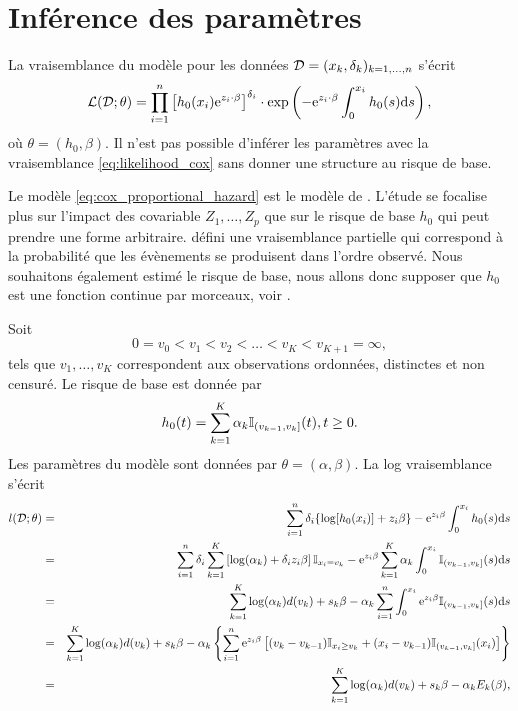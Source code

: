 \section{Inférence des paramètres}
La vraisemblance du modèle pour les données $\mathcal{D} = (x_k,\delta_k)_{k=1,\ldots, n}$ s'écrit 
\begin{equation}\label{eq:likelihood_cox}
\mathcal{L}(\mathcal{D};\theta) =\prod_{i=1}^n \left[h_0(x_i)\mathrm{e}^{z_i\cdot \beta}\right]^{\delta_i}\cdot\exp\left(-\mathrm{e}^{z_i\cdot\beta} \int_0^{x_i}h_0(s)\text{d}s\right) ,
\end{equation}
où $\theta = (h_0,\beta)$. Il n'est pas possible d'inférer les paramètres avec la vraisemblance \eqref{eq:likelihood_cox} sans donner une structure au risque de base. 
\begin{remark}
Le modèle \eqref{eq:cox_proportional_hazard} est le modèle de \citet{Cox1972}. L'étude se focalise plus sur l'impact des covariable $Z_1,\ldots, Z_p$ que sur le risque de base $h_0$ qui peut prendre une forme arbitraire. \citet{Cox1972} défini une vraisemblance partielle qui correspond à la probabilité que les évènements se produisent dans l'ordre observé. Nous souhaitons également estimé le risque de base, nous allons donc supposer que $h_0$ est une fonction continue par morceaux, voir \citet{Breslow1975}.
\end{remark}
Soit 
$$
0=v_0<v_1<v_2<\ldots<v_K<v_{K+1}=\infty,
$$
tels que $v_1,\ldots, v_K$ correspondent aux observations ordonnées, distinctes et non censuré. Le risque de base est donnée par
$$
h_0(t)=\sum_{k=1}^{K}\alpha_k\mathbb{I}_{(v_{k-1}, v_{k}]}(t),t\geq 0.
$$
Les paramètres du modèle sont données par $\theta = (\alpha, \beta)$. La log vraisemblance s'écrit
\begin{eqnarray*}
l(\mathcal{D};\theta)&=&\sum_{i=1}^n\delta_i\{\log[h_0(x_i)]+z_i\beta\}-\mathrm{e}^{z_i\beta}\int_0^{x_i}h_0(s)\text{d}s\\
&=& \sum_{i=1}^n\delta_i\sum_{k=1}^K\left[\log(\alpha_k)+\delta_i z_i\beta\right]\mathbb{I}_{x_i = v_k} -\mathrm{e}^{z_i\beta}\sum_{k=1}^K\alpha_k\int_0^{x_i}\mathbb{I}_{(v_{k-1}, v_k]}(s)\text{d}s\\
&=& \sum_{k=1}^K\log(\alpha_k)d(v_k)+s_k\beta -\alpha_k\sum_{i=1}^{n}\int_0^{x_i}\mathrm{e}^{z_i\beta}\mathbb{I}_{(v_{k-1}, v_k]}(s)\text{d}s\\
&=& \sum_{k=1}^K\log(\alpha_k)d(v_k)+s_k\beta -\alpha_k\left\{\sum_{i=1}^{n}\mathrm{e}^{z_i\beta}\left[(v_k - v_{k-1})\mathbb{I}_{x_i\geq v_k} +(x_i - v_{k-1})\mathbb{I}_{(v_{k-1},v_k]}(x_i)\right]\right\}\\
&=& \sum_{k=1}^K\log(\alpha_k)d(v_k)+s_k\beta -\alpha_kE_k(\beta),\\
\end{eqnarray*}
